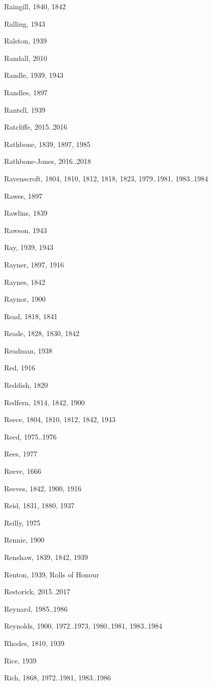{\begin{theindex}
\item Raingill, 1840, 1842
\item Ralling, 1943
\item Ralston, 1939
\item Randall, 2010
\item Randle, 1939, 1943
\item Randles, 1897
\item Rantell, 1939
\item Ratcliffe, 2015..2016
\item Rathbone, 1839, 1897, 1985
\item Rathbone-Jones, 2016..2018
\item Ravenscroft, 1804, 1810, 1812, 1818, 1823, 1979..1981, 1983..1984
\item Rawes, 1897
\item Rawlins, 1839
\item Rawson, 1943
\item Ray, 1939, 1943
\item Rayner, 1897, 1916
\item Raynes, 1842
\item Raynor, 1900
\item Read, 1818, 1841
\item Reade, 1828, 1830, 1842
\item Readman, 1938
\item Red, 1916
\item Reddish, 1820
\item Redfern, 1814, 1842, 1900
\item Reece, 1804, 1810, 1812, 1842, 1943
\item Reed, 1975..1976
\item Rees, 1977
\item Reeve, 1666
\item Reeves, 1842, 1900, 1916
\item Reid, 1831, 1880, 1937
\item Reilly, 1975
\item Rennie, 1900
\item Renshaw, 1839, 1842, 1939
\item Renton, 1939, Rolls of Honour
\item Restorick, 2015..2017
\item Reynard, 1985..1986
\item Reynolds, 1900, 1972..1973, 1980..1981, 1983..1984
\item Rhodes, 1810, 1939
\item Rice, 1939
\item Rich, 1868, 1972..1981, 1983..1986

\end{theindex}}
